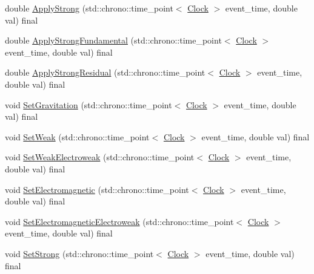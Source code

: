 \begin{DoxyCompactItemize}
double \mbox{\hyperlink{classDimension_a621e8f7f24db86e836c5b3da0f019290}{Apply\+Strong}} (std\+::chrono\+::time\+\_\+point$<$ \mbox{\hyperlink{universe_8h_a0ef8d951d1ca5ab3cfaf7ab4c7a6fd80}{Clock}} $>$ event\+\_\+time, double val) final
\item 
double \mbox{\hyperlink{classDimension_afb01fb9e469da18899d4b14e5f095ece}{Apply\+Strong\+Fundamental}} (std\+::chrono\+::time\+\_\+point$<$ \mbox{\hyperlink{universe_8h_a0ef8d951d1ca5ab3cfaf7ab4c7a6fd80}{Clock}} $>$ event\+\_\+time, double val) final
\item 
double \mbox{\hyperlink{classDimension_a2ae0b6a8ee17f6e28b6d2d3209df4bf4}{Apply\+Strong\+Residual}} (std\+::chrono\+::time\+\_\+point$<$ \mbox{\hyperlink{universe_8h_a0ef8d951d1ca5ab3cfaf7ab4c7a6fd80}{Clock}} $>$ event\+\_\+time, double val) final
\item 
void \mbox{\hyperlink{classDimension_aeec6887382d09e3d78382582ff4e7c33}{Set\+Gravitation}} (std\+::chrono\+::time\+\_\+point$<$ \mbox{\hyperlink{universe_8h_a0ef8d951d1ca5ab3cfaf7ab4c7a6fd80}{Clock}} $>$ event\+\_\+time, double val) final
\item 
void \mbox{\hyperlink{classDimension_a157cfa28dd6bc5518d622d01445ca827}{Set\+Weak}} (std\+::chrono\+::time\+\_\+point$<$ \mbox{\hyperlink{universe_8h_a0ef8d951d1ca5ab3cfaf7ab4c7a6fd80}{Clock}} $>$ event\+\_\+time, double val) final
\item 
void \mbox{\hyperlink{classDimension_a1d2accef9e6adf747f5cc143ae4527c9}{Set\+Weak\+Electroweak}} (std\+::chrono\+::time\+\_\+point$<$ \mbox{\hyperlink{universe_8h_a0ef8d951d1ca5ab3cfaf7ab4c7a6fd80}{Clock}} $>$ event\+\_\+time, double val) final
\item 
void \mbox{\hyperlink{classDimension_ad8c18ce6358904e01594092dca9f1311}{Set\+Electromagnetic}} (std\+::chrono\+::time\+\_\+point$<$ \mbox{\hyperlink{universe_8h_a0ef8d951d1ca5ab3cfaf7ab4c7a6fd80}{Clock}} $>$ event\+\_\+time, double val) final
\item 
void \mbox{\hyperlink{classDimension_aead73fc6a25388d14b514b2170735b1b}{Set\+Electromagnetic\+Electroweak}} (std\+::chrono\+::time\+\_\+point$<$ \mbox{\hyperlink{universe_8h_a0ef8d951d1ca5ab3cfaf7ab4c7a6fd80}{Clock}} $>$ event\+\_\+time, double val) final
\item 
void \mbox{\hyperlink{classDimension_ab9021cb6727ed590026bf870c638576d}{Set\+Strong}} (std\+::chrono\+::time\+\_\+point$<$ \mbox{\hyperlink{universe_8h_a0ef8d951d1ca5ab3cfaf7ab4c7a6fd80}{Clock}} $>$ event\+\_\+time, double val) final
\item 

\end{DoxyCompactItemize}
